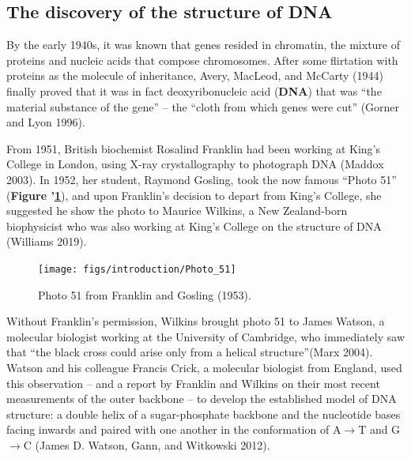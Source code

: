 \documentclass[
]{book}
\begin{document}
\hypertarget{the-discovery-of-the-structure-of-dna}{%
\subsection{The discovery of the structure of DNA}\label{the-discovery-of-the-structure-of-dna}}

By the early 1940s, it was known that genes resided in chromatin, the mixture of proteins and nucleic acids that compose chromosomes. After some flirtation with proteins as the molecule of inheritance, Avery, MacLeod, and McCarty (1944) finally proved that it was in fact deoxyribonucleic acid (\textbf{DNA}) that was ``the material substance of the gene'' -- the ``cloth from which genes were cut'' (Gorner and Lyon 1996).

From 1951, British biochemist Rosalind Franklin had been working at King's College in London, using X-ray crystallography to photograph DNA (Maddox 2003). In 1952, her student, Raymond Gosling, took the now famous ``Photo 51'' (\textbf{Figure '\ref{fig:photo51}}), and upon Franklin's decision to depart from King's College, she suggested he show the photo to Maurice Wilkins, a New Zealand-born biophysicist who was also working at King's College on the structure of DNA (Williams 2019).



\begin{figure}

{\centering \texttt{[image: figs/introduction/Photo\_51]} 

}

\caption{Photo 51 from Franklin and Gosling (1953).}\label{fig:photo51}
\end{figure}

Without Franklin's permission, Wilkins brought photo 51 to James Watson, a molecular biologist working at the University of Cambridge, who immediately saw that ``the black cross could arise only from a helical structure''(Marx 2004). Watson and his colleague Francis Crick, a molecular biologist from England, used this observation -- and a report by Franklin and Wilkins on their most recent measurements of the outer backbone -- to develop the established model of DNA structure: a double helix of a sugar-phosphate backbone and the nucleotide bases facing inwards and paired with one another in the conformation of A\(\rightarrow\)T and G\(\rightarrow\)C (James D. Watson, Gann, and Witkowski 2012).
\end{document}
